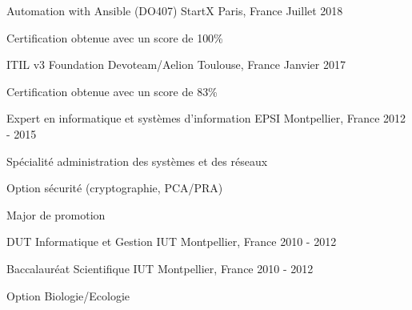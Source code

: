 

\begin{cventries}

  \cventry
    {Automation with Ansible (DO407)} %
    {StartX} %
    {Paris, France} %
    {Juillet 2018} %
    {
      \begin{cvitems} %
        \item {Certification obtenue avec un score de 100\%}
      \end{cvitems}
    }

\cventry
{ITIL v3 Foundation} %
{Devoteam/Aelion} %
{Toulouse, France} %
{Janvier 2017} %
{
  \begin{cvitems} %
    \item {Certification obtenue avec un score de 83\%}
  \end{cvitems}
}

\cventry
{Expert en informatique et systèmes d'information} %
{EPSI} %
{Montpellier, France} %
{2012 - 2015} %
{
  \begin{cvitems} %
    \item {Spécialité administration des systèmes et des réseaux}
    \item {Option sécurité (cryptographie, PCA/PRA)}
    \item {Major de promotion}
  \end{cvitems}
}

\cventry
{DUT Informatique et Gestion} %
{IUT} %
{Montpellier, France} %
{2010 - 2012} %
{}

\cventry
{Baccalauréat Scientifique} %
{IUT} %
{Montpellier, France} %
{2010 - 2012} %
{
  \begin{cvitems} %
    \item {Option Biologie/Ecologie}
  \end{cvitems}
}

\end{cventries}
